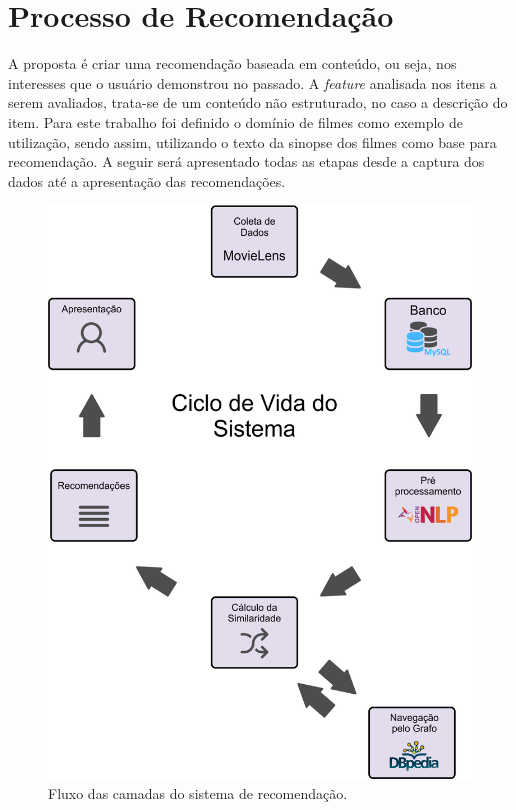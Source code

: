 \section{Processo de Recomendação}

A proposta é criar uma recomendação baseada em conteúdo, ou seja, nos interesses que o usuário demonstrou no passado. A \textit{feature} analisada nos itens a serem avaliados, trata-se de um conteúdo não estruturado, no caso a descrição do item. Para este trabalho foi definido o domínio de filmes como exemplo de utilização, sendo assim, utilizando o texto da sinopse dos filmes como base para recomendação. A seguir será apresentado todas as etapas desde a captura dos dados até a apresentação das recomendações.

\begin{figure}
	\centering
	\includegraphics[scale=0.42]{imagens/recsys_fluxo.png}
	\caption{Fluxo das camadas do sistema de recomendação.}
	\label{fig:recsys_fluxo}
\end{figure}

